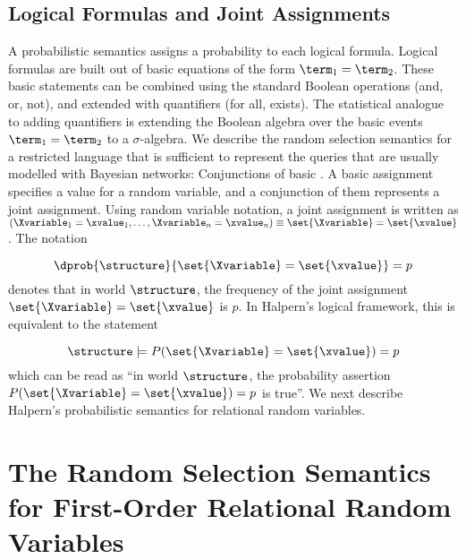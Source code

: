 \documentclass{article}
\begin{document}
\subsection{Logical Formulas and Joint Assignments}

A probabilistic semantics assigns a probability to each logical formula. Logical formulas are built out of basic equations of the form $\term_{1} = \term_{2}$. These basic statements can be combined using the standard Boolean operations (and, or, not), and extended with quantifiers (for all, exists). The statistical analogue to adding quantifiers is extending the Boolean algebra over the basic events $\term_{1} = \term_{2}$ to a $\sigma$-algebra. We describe the random selection semantics for a restricted language that is sufficient to represent the queries that are usually modelled with Bayesian networks: Conjunctions of basic . A basic assignment specifies a value for a random variable, and a conjunction of them represents a joint assignment. Using random variable notation, a joint assignment is written as $(\Xvariable_{1}=\xvalue_{1},\ldots,\Xvariable_{n} = \xvalue_{n}) \equiv \set{\Xvariable} = \set{\xvalue}$. The notation 

$$\dprob{\structure}{\set{\Xvariable} = \set{\xvalue}}=p$$ denotes that in world $\structure$, the frequency of the joint assignment $\set{\Xvariable} = \set{\xvalue}$ is $p$. In Halpern's logical framework, this is equivalent to the statement 

$$\structure \models P(\set{\Xvariable} = \set{\xvalue})=p$$ which can be read as ``in world $\structure$, the probability assertion $P(\set{\Xvariable} = \set{\xvalue})=p$ is true''. 
We next describe Halpern's probabilistic semantics for relational random variables.

\section{The Random Selection Semantics for First-Order Relational Random Variables}




\end{document}
